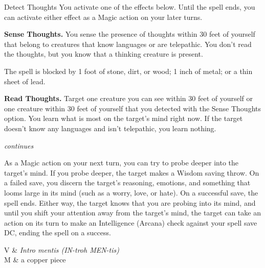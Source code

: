 \begin{Spell}[
  tags=Concentration,
  level={2nd},
  time={1 action},
  range={Self},
  components={V, S, M},
  duration={1 minute},
  school={Divination},
  attack={WIS Save},
  effect={Detection}
]{Detect Thoughts}
You activate one of the effects below. Until the spell ends, you can activate either effect as a Magic action on your later turns.

\textbf{Sense Thoughts.} You sense the presence of thoughts within 30 feet of yourself that belong to creatures that know languages or are telepathic. You don't read the thoughts, but you know that a thinking creature is present.

The spell is blocked by 1 foot of stone, dirt, or wood; 1 inch of metal; or a thin sheet of lead.

\textbf{Read Thoughts.} Target one creature you can see within 30 feet of yourself or one creature within 30 feet of yourself that you detected with the Sense Thoughts option. You learn what is most on the target's mind right now. If the target doesn't know any languages and isn't telepathic, you learn nothing.

\hfill \textit{\footnotesize continues}
\newpage
{}

As a Magic action on your next turn, you can try to probe deeper into the target's mind. If you probe deeper, the target makes a Wisdom saving throw. On a failed save, you discern the target's reasoning, emotions, and something that looms large in its mind (such as a worry, love, or hate). On a successful save, the spell ends. Either way, the target knows that you are probing into its mind, and until you shift your attention away from the target's mind, the target can take an action on its turn to make an Intelligence (Arcana) check against your spell save DC, ending the spell on a success.

\begin{components}
V & \textit{Intro mentis (IN-troh MEN-tis)} \\
M & a copper piece
\end{components}
\end{Spell}


